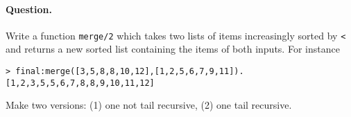 \paragraph{Question.} Write a function \texttt{merge/2} which takes
two lists of items increasingly sorted by \verb|<| and returns a new
sorted list containing the items of both inputs. For instance 
{\small
\begin{verbatim}
> final:merge([3,5,8,8,10,12],[1,2,5,6,7,9,11]).
[1,2,3,5,5,6,7,8,8,9,10,11,12]
\end{verbatim}
}
\noindent Make two versions: (1) one not tail recursive, (2) one tail
recursive.
